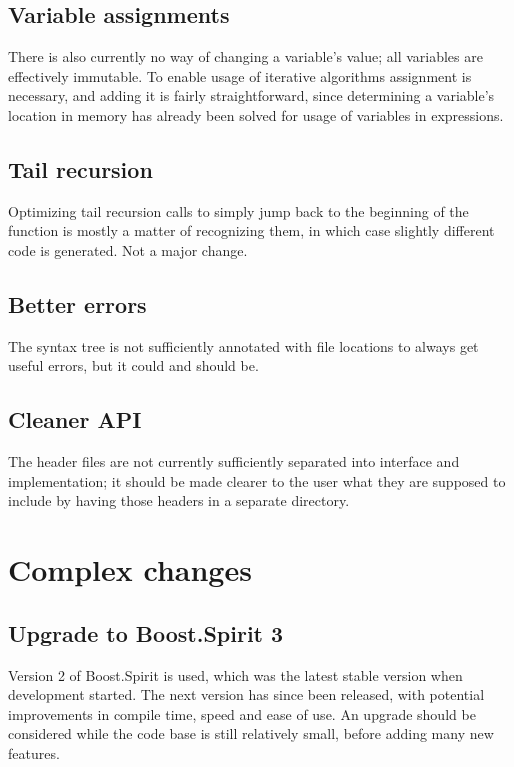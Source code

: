 		\subsection{Variable assignments}
		
		There is also currently no way of changing a variable's value; all variables are effectively immutable. To enable usage of iterative algorithms assignment is necessary, and adding it is fairly straightforward, since determining a variable's location in memory has already been solved for usage of variables in expressions.
		
		\subsection{Tail recursion}
		
		Optimizing tail recursion calls to simply jump back to the beginning of the function is mostly a matter of recognizing them, in which case slightly different code is generated. Not a major change.
		
		\subsection{Better errors}
		
		The syntax tree is not sufficiently annotated with file locations to always get useful errors, but it could and should be.
		
		\subsection{Cleaner API}
		
		The header files are not currently sufficiently separated into interface and implementation; it should be made clearer to the user what they are supposed to include by having those headers in a separate directory.
	
	\section{Complex changes}
		
		\subsection{Upgrade to Boost.Spirit 3}
		
		Version 2 of Boost.Spirit is used, which was the latest stable version when development started. The next version has since been released, with potential improvements in compile time, speed and ease of use. An upgrade should be considered while the code base is still relatively small, before adding many new features.
		

